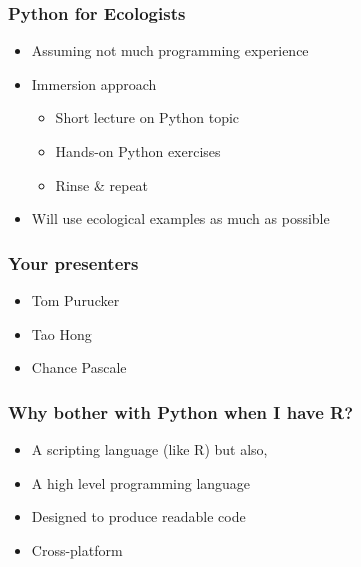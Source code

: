 \documentclass{beamer}
\begin{document}

\begin{frame}[fragile]
\frametitle{Python for Ecologists}
\begin{itemize}
  \item Assuming not much programming experience
  \item Immersion approach 
\begin{itemize}
  \item Short lecture on Python topic
  \item Hands-on Python exercises 
  \item Rinse \& repeat
\end{itemize}
  \item Will use ecological examples as much as possible
\end{itemize} 
\end{frame}

\begin{frame}[fragile]
\frametitle{Your presenters}
\begin{itemize}
\item Tom Purucker  
\item Tao Hong 
\item Chance Pascale
\end{itemize} 
\end{frame}

\begin{frame}[fragile]
\frametitle{Why bother with Python when I have R?}
\begin{itemize}
\item A scripting language (like R) but also, 
\item A high level programming language
\item Designed to produce readable code 
\item Cross-platform 
\end{itemize} 
\end{frame}
\end{document}
